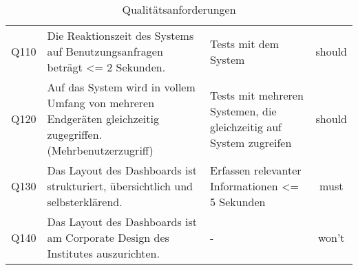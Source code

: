 \begin{table}[h]
\begin{adjustbox}{max width=\textwidth}
\begin{tabular}{lp{6.5cm}p{6.5cm}c}
        Q110                              &Die Reaktionszeit des Systems auf Benutzungsanfragen beträgt <= 2 Sekunden. & Tests mit dem System& should\\
        Q120                              &Auf das System wird in vollem Umfang von mehreren Endgeräten gleichzeitig zugegriffen. (Mehrbenutzerzugriff) & Tests mit mehreren Systemen, die gleichzeitig auf System zugreifen& should\\
        Q130                              &Das Layout des Dashboards ist strukturiert, übersichtlich und selbsterklärend. & Erfassen relevanter Informationen <= 5 Sekunden& must\\
        Q140                              &Das Layout des Dashboards ist am Corporate Design des Institutes auszurichten. & -& won't\\
       \bottomrule
    \end{tabular}
    \end{adjustbox}
    \caption{%
        Qualitätsanforderungen
    }
    \label{tab:Qualitätsanforderungen}
    \end{table}
\endgroup
